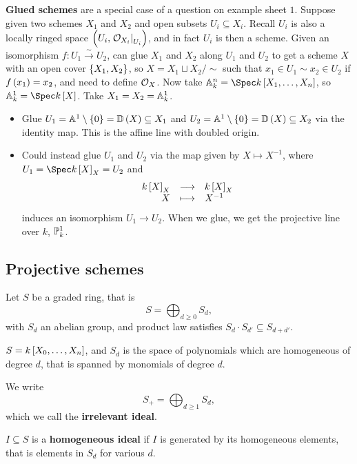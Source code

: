 \begin{example*}
\textbf{Glued schemes} are a special case of a question on example sheet $ 1 $. Suppose given two schemes $ X_1 $ and $ X_2 $ and open subsets $ U_i \subseteq X_i $. Recall $ U_i $ is also a locally ringed space $ \br{U_i, \eval{\OOO_{X_i}}_{U_i}} $, and in fact $ U_i $ is then a scheme. Given an isomorphism $ f : U_1 \xrightarrow{\sim} U_2 $, can glue $ X_1 $ and $ X_2 $ along $ U_1 $ and $ U_2 $ to get a scheme $ X $ with an open cover $ \cbr{X_1, X_2} $, so $ X = X_1 \sqcup X_2 / \sim $ such that $ x_1 \in U_1 \sim x_2 \in U_2 $ if $ f\br{x_1} = x_2 $, and need to define $ \OOO_X $. Now take $ \AA_k^n = \Spec k\sbr{X_1, \dots, X_n} $, so $ \AA_k^1 = \Spec k\sbr{X} $. Take $ X_1 = X_2 = \AA_k^1 $.
\begin{itemize}
\item Glue $ U_1 = \AA^1 \setminus \cbr{0} = \DD\br{X} \subseteq X_1 $ and $ U_2 = \AA^1 \setminus \cbr{0} = \DD\br{X} \subseteq X_2 $ via the identity map. This is the affine line with doubled origin.
\item Could instead glue $ U_1 $ and $ U_2 $ via the map given by $ X \mapsto X^{-1} $, where $ U_1 = \Spec k\sbr{X}_X = U_2 $ and
$$ \function{k\sbr{X}_X}{k\sbr{X}_X}{X}{X^{-1}} $$
induces an isomorphism $ U_1 \to U_2 $. When we glue, we get the projective line over $ k $, $ \PP_k^1 $.
\end{itemize}
\end{example*}

\subsection{Projective schemes}

Let $ S $ be a graded ring, that is
$$ S = \bigoplus_{d \ge 0} S_d, $$
with $ S_d $ an abelian group, and product law satisfies $ S_d \cdot S_{d'} \subseteq S_{d + d'} $.

\begin{example*}
$ S = k\sbr{X_0, \dots, X_n} $, and $ S_d $ is the space of polynomials which are homogeneous of degree $ d $, that is spanned by monomials of degree $ d $.
\end{example*}

We write
$$ S_+ = \bigoplus_{d \ge 1} S_d, $$
which we call the \textbf{irrelevant ideal}.

\begin{definition*}
$ I \subseteq S $ is a \textbf{homogeneous ideal} if $ I $ is generated by its homogeneous elements, that is elements in $ S_d $ for various $ d $.
\end{definition*}


